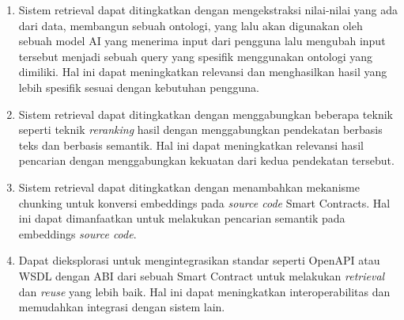 \begin{enumerate}
    \item Sistem retrieval dapat ditingkatkan dengan mengekstraksi nilai-nilai yang ada dari data, membangun sebuah ontologi, yang lalu akan digunakan oleh sebuah model AI yang menerima input dari pengguna lalu mengubah input tersebut menjadi sebuah query yang spesifik menggunakan ontologi yang dimiliki. Hal ini dapat meningkatkan relevansi dan menghasilkan hasil yang lebih spesifik sesuai dengan kebutuhan pengguna.
    \item Sistem retrieval dapat ditingkatkan dengan menggabungkan beberapa teknik seperti teknik \textit{reranking} hasil dengan menggabungkan pendekatan berbasis teks dan berbasis semantik. Hal ini dapat meningkatkan relevansi hasil pencarian dengan menggabungkan kekuatan dari kedua pendekatan tersebut.
    \item Sistem retrieval dapat ditingkatkan dengan menambahkan mekanisme chunking untuk konversi embeddings pada \textit{source code} Smart Contracts. Hal ini dapat dimanfaatkan untuk melakukan pencarian semantik pada embeddings \textit{source code}.
    \item Dapat dieksplorasi untuk mengintegrasikan standar seperti OpenAPI atau WSDL dengan ABI dari sebuah Smart Contract untuk melakukan \textit{retrieval} dan \textit{reuse} yang lebih baik. Hal ini dapat meningkatkan interoperabilitas dan memudahkan integrasi dengan sistem lain.
\end{enumerate}

